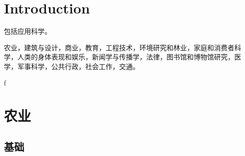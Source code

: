 


\chapter{Introduction}

包括应用科学。

农业，建筑与设计，商业，教育，工程技术，环境研究和林业，家庭和消费者科学，人类的身体表现和娱乐，新闻学与传播学，法律，图书馆和博物馆研究，医学，军事科学，公共行政，社会工作，交通。

f

\chapter{农业}

\section{基础}

